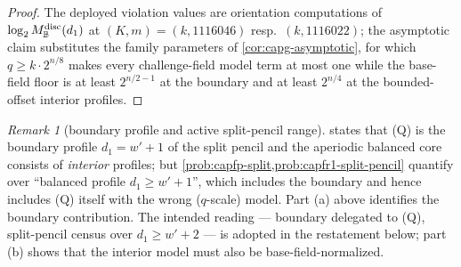 \documentclass[11pt]{article}
\theoremstyle{definition}
\theoremstyle{remark}
\newtheorem{remark}[remark]{Remark}
\newcommand{\B}{\mathbb{B}}
\begin{document}
\begin{proof}
The deployed violation values are orientation computations of
$\log_2M_{\B}^{\rm disc}(d_1)$ at $(K,m)=(k,1116046)$ resp.\ $(k,1116022)$; the
asymptotic claim substitutes the family parameters of
\cref{cor:capg-asymptotic}, for which
$q\ge k\cdot2^{n/8}$ makes every challenge-field model term at most one
while the base-field floor is at least $2^{n/2-1}$ at the boundary and at
least $2^{n/4}$ at the bounded-offset interior profiles.
\end{proof}

\begin{remark}[boundary profile and active split-pencil range]
\label{rem:capg-boundary-offbyone}
 states that \textup{(Q)} is the boundary
profile $d_1=w'+1$ of the split pencil and the aperiodic balanced core
consists of \emph{interior} profiles; but
\cref{prob:capfp-split,prob:capfr1-split-pencil} quantify over
``balanced profile $d_1\ge w'+1$'', which includes the boundary and
hence includes \textup{(Q)} itself with the wrong ($q$-scale) model.
Part \textup{(a)} above identifies the boundary contribution.  The intended
reading --- boundary delegated to \textup{(Q)}, split-pencil census over
$d_1\ge w'+2$ --- is adopted in the restatement below; part \textup{(b)}
shows that the interior model must also be base-field-normalized.
\end{remark}
\end{document}
